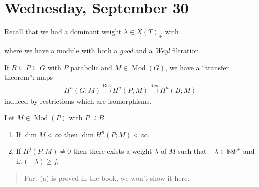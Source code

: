 \hypertarget{wednesday-september-30}{%
\section{Wednesday, September 30}\label{wednesday-september-30}}

Recall that we had a dominant weight \(\lambda \in X(T)_+\) with

\begin{center}
\end{center}

where we have a module with both a \emph{good} and a \emph{Weyl}
filtration.

If \(B\subseteq P \subseteq G\) with \(P\) parabolic and
\(M\in {\operatorname{Mod}}(G)\), we have a ``transfer theorem'': maps
\begin{align*}   H^n(G; M) \xrightarrow{\operatorname{Res}} H^n(P; M) \xrightarrow{\operatorname{Res}} H^n(B; M) \end{align*}
induced by restrictions which are isomorphisms.

\begin{proposition}[?]

\begin{proposition}[?]

Let \(M\in {\operatorname{Mod}}(P)\) with \(P\supseteq B\).

\begin{enumerate}
\def\labelenumi{\alph{enumi}.}
\item
  If \(\dim M < \infty\) then \(\dim H^n(P; M) < \infty\).
\item
  If \(H^j(P; M) \neq 0\) then there exists a weight \(\lambda\) of
  \(M\) such that \(-\lambda \in {\mathbb{N}}\Phi^+\) and
  \(\text{ht}(-\lambda) \geq j\).
\end{enumerate}

\end{proposition}

\end{proposition}

\begin{quote}
Part (a) is proved in the book, we won't show it here.
\end{quote}

